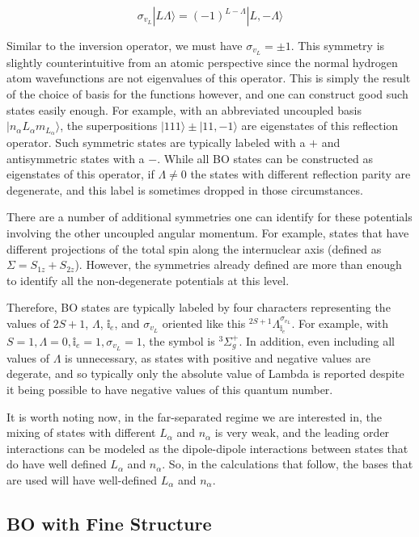 \documentclass[prl, longbibliography]{revtex4-2}
\begin{document}
$$
\sigma_{v_L}|L\Lambda\rangle = (-1)^{L-\Lambda}|L,-\Lambda\rangle
$$

Similar to the inversion operator, we must have $\sigma _{v_L}=\pm 1$. This symmetry is slightly counterintuitive from an atomic perspective since the normal hydrogen atom wavefunctions are not eigenvalues of this operator. 
This is simply the result of the choice of basis for the functions however, and one can construct good such states easily enough. For example, with an abbreviated uncoupled basis $|n_\alpha L_\alpha m_{L_\alpha}\rangle$, the superpositions $|111\rangle \pm |11,-1\rangle$ are eigenstates of this reflection operator.
Such symmetric states are typically labeled with a $+$ and antisymmetric states with a $-$. While all BO states can be constructed as eigenstates of this operator, if $\Lambda\ne 0$ the states with different reflection parity are degenerate, and this label is sometimes dropped in those circumstances.

There are a number of additional symmetries one can identify for these potentials involving the other uncoupled angular momentum. For example, states that have different projections of the total spin along the internuclear axis (defined as $\Sigma=S_{1z}+S_{2z}$). However, the symmetries already defined are more than enough to identify all the non-degenerate potentials at this level.

Therefore, BO states are typically labeled by four characters representing the values of $2S+1$, $\Lambda$, $\mathbb{i}_{e}$, and $\sigma_{v_L}$ oriented like this $^{2S+1}\Lambda^{\sigma_{v_L}}_{\mathbb{i}_e}$. For example, with $S=1,\Lambda=0,\mathbb{i}_e=1,\sigma_{v_L}=1$, the symbol is $^3\Sigma_g^+$. In addition, even including all values of $\Lambda$ is unnecessary, as states with positive and negative values are degerate, and so typically only the absolute value of Lambda is reported despite it being possible to have negative values of this quantum number.

It is worth noting now, in the far-separated regime we are interested in, the mixing of states with different $L_\alpha$ and $n_\alpha$ is very weak, and the leading order interactions can be modeled as the dipole-dipole interactions between states that do have well defined $L_\alpha$ and $n_\alpha$. So, in the calculations that follow, the bases that are used will have well-defined $L_\alpha$ and $n_\alpha$. 

\subsection{BO with Fine Structure}
\end{document}
